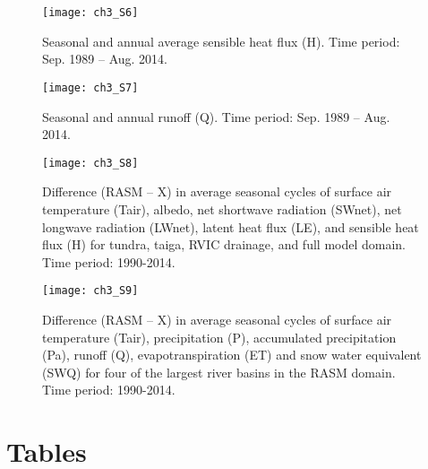 \begin{figure}
    \centering
    \texttt{[image: ch3\_S6]}
    \caption{Seasonal and annual average sensible heat flux (H).
    Time period: Sep. 1989 – Aug. 2014.}
\end{figure}

\begin{figure}
    \centering
    \texttt{[image: ch3\_S7]}
    \caption{Seasonal and annual runoff (Q).
    Time period: Sep. 1989 – Aug. 2014.}
\end{figure}

\begin{figure}
    \centering
    \texttt{[image: ch3\_S8]}
    \caption{Difference (RASM – X) in average seasonal cycles of surface air temperature (Tair), albedo, net shortwave radiation (SWnet), net longwave radiation (LWnet), latent heat flux (LE), and sensible heat flux (H) for tundra, taiga, RVIC drainage, and full model domain.
    Time period: 1990-2014.}
\end{figure}

\begin{figure}
    \centering
    \texttt{[image: ch3\_S9]}
    \caption{Difference (RASM – X) in average seasonal cycles of surface air temperature (Tair), precipitation (P), accumulated precipitation (Pa), runoff (Q), evapotranspiration (ET) and snow water equivalent (SWQ) for four of the largest river basins in the RASM domain.
    Time period: 1990-2014.}
\end{figure}

\section{Tables}

